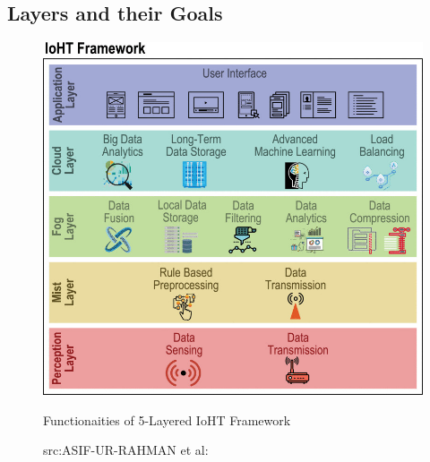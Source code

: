 \subsection{Layers and their Goals}
\begin{figure}[H]
	\centering
	\includegraphics[width=\linewidth]{image/layered.jpg}
	\caption{Functionaities of 5-Layered IoHT Framework}
	\caption*{src:ASIF-UR-RAHMAN et al:\cite{3}}
\end{figure}

